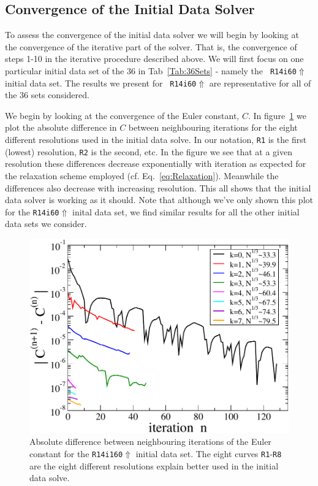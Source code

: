 \subsection{Convergence of the Initial Data Solver}
To assess the convergence of the initial data solver we will begin by looking at the convergence of the iterative part of the solver. That is, the convergence of steps 1-10 in the iterative procedure
described above. We will first focus on one particular initial data
set of the 36 in Tab~\ref{Tab:36Sets} - namely the {\tt
  R14i60$\Uparrow$} initial data set. The results we present for {\tt
  R14i60$\Uparrow$} are representative for all of the 36 sets considered.

We begin by looking at the convergence of the Euler constant, $C$. In figure~\ref{Fig:EulerConv} we plot the absolute difference in $C$ between neighbouring iterations for the eight
different resolutions used in the initial data solve. In our notation, {\tt R1} is the first (lowest) resolution, {\tt R2} is the second, etc. In the figure we see that at a given resolution these differences
decrease exponentially with iteration as expected for the relaxation
scheme employed (cf. Eq.~\ref{eq:Relaxation}). Meanwhile the differences also decrease with increasing resolution. This all shows that the initial data solver is working as it should. Note that although we've only shown
this plot for the {\tt R14i60$\Uparrow$} inital data set, we find similar results for all the other initial data sets we consider.


\begin{figure}
\includegraphics[width=0.95\columnwidth]{chap4/EulerConv}
\caption[Convergence of the Euler constant for the {\tt
  R14160$\Uparrow$}]{\label{Fig:EulerConv}
Absolute difference between neighbouring iterations of the Euler
constant for the {\tt R14i160$\Uparrow$} initial data set. The eight
curves {\tt R1}-{\tt R8} are the eight different resolutions {\red
  explain better}
used in the initial data solve.}
\end{figure}

